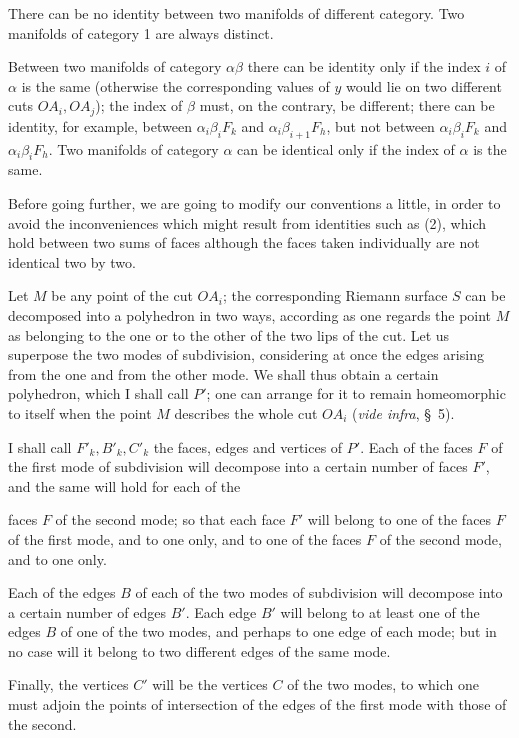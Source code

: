 \documentclass{article}
\begin{document}
There can be no identity between two manifolds of different category. Two manifolds of category 1 are always distinct.

Between two manifolds of category $\alpha\beta$ there can be identity only if the index $i$ of $\alpha$ is the same (otherwise the corresponding values of $y$ would lie on two different cuts $OA_{i}, OA_{j}$); the index of $\beta$ must, on the contrary, be different; there can be identity, for example, between $\alpha_{i}\beta_{i}F_{k}$ and $\alpha_{i}\beta_{i+1}F_{h}$, but not between $\alpha_{i}\beta_{i}F_{k}$ and $\alpha_{i}\beta_{i}F_{h}$. Two manifolds of category $\alpha$ can be identical only if the index of $\alpha$ is the same.

Before going further, we are going to modify our conventions a little, in order to avoid the inconveniences which might result from identities such as (2), which hold between two sums of faces although the faces taken individually are not identical two by two.

Let $M$ be any point of the cut $OA_{i}$; the corresponding Riemann surface $S$ can be decomposed into a polyhedron in two ways, according as one regards the point $M$ as belonging to the one or to the other of the two lips of the cut. Let us superpose the two modes of subdivision, considering at once the edges arising from the one and from the other mode. We shall thus obtain a certain polyhedron, which I shall call $P'$; one can arrange for it to remain homeomorphic to itself when the point $M$ describes the whole cut $OA_{i}$ (\emph{vide infra}, \S~5).

I shall call $F'_{k}, B'_{k}, C'_{k}$ the faces, edges and vertices of $P'$. Each of the faces $F$ of the first mode of subdivision will decompose into a certain number of faces $F'$, and the same will hold for each of the

faces $F$ of the second mode; so that each face $F'$ will belong to one of the faces $F$ of the first mode, and to one only, and to one of the faces $F$ of the second mode, and to one only.

Each of the edges $B$ of each of the two modes of subdivision will decompose into a certain number of edges $B'$. Each edge $B'$ will belong to at least one of the edges $B$ of one of the two modes, and perhaps to one edge of each mode; but in no case will it belong to two different edges of the same mode.

Finally, the vertices $C'$ will be the vertices $C$ of the two modes, to which one must adjoin the points of intersection of the edges of the first mode with those of the second.
\end{document}
